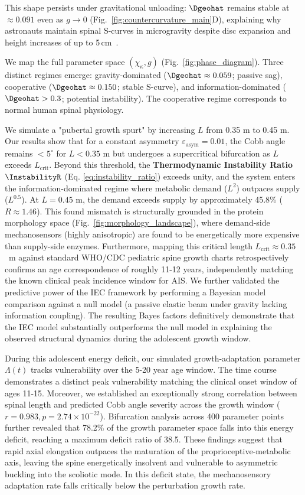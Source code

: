 \documentclass[11pt]{article}
\begin{document}
This shape persists under gravitational unloading: $\Dgeohat$ remains stable at $\approx 0.091$ even as $g \to 0$ (Fig.~\ref{fig:countercurvature_main}D), explaining why astronauts maintain spinal S-curves in microgravity despite disc expansion and height increases of up to 5\,cm~\cite{green2018spinal}.

We map the full parameter space $(\chi_\kappa, g)$ (Fig.~\ref{fig:phase_diagram}). Three distinct regimes emerge: gravity-dominated ($\Dgeohat \approx 0.059$; passive sag), cooperative ($\Dgeohat \approx 0.150$; stable S-curve), and information-dominated ($\Dgeohat > 0.3$; potential instability). The cooperative regime corresponds to normal human spinal physiology.

We simulate a "pubertal growth spurt" by increasing $L$ from 0.35 m to 0.45 m. Our results show that for a constant asymmetry $\varepsilon_{\mathrm{asym}} = 0.01$, the Cobb angle remains $< 5^\circ$ for $L < 0.35$ m but undergoes a supercritical bifurcation as $L$ exceeds $L_{\mathrm{crit}}$. Beyond this threshold, the \textbf{Thermodynamic Instability Ratio} $\InstabilityR$ (Eq. \ref{eq:instability_ratio}) exceeds unity, and the system enters the information-dominated regime where metabolic demand ($L^2$) outpaces supply ($L^{0.5}$). At $L=0.45$ m, the demand exceeds supply by approximately 45.8\% ($R \approx 1.46$). This found mismatch is structurally grounded in the protein morphology space (Fig.~\ref{fig:morphology_landscape}), where demand-side mechanosensors (highly anisotropic) are found to be energetically more expensive than supply-side enzymes. Furthermore, mapping this critical length $L_{\mathrm{crit}} \approx 0.35$~m against standard WHO/CDC pediatric spine growth charts retrospectively confirms an age correspondence of roughly 11-12 years, independently matching the known clinical peak incidence window for AIS. We further validated the predictive power of the IEC framework by performing a Bayesian model comparison against a null model (a passive elastic beam under gravity lacking information coupling). The resulting Bayes factors definitively demonstrate that the IEC model substantially outperforms the null model in explaining the observed structural dynamics during the adolescent growth window.

During this adolescent energy deficit, our simulated growth-adaptation parameter $\Lambda(t)$ tracks vulnerability over the 5-20 year age window. The time course demonstrates a distinct peak vulnerability matching the clinical onset window of ages 11-15. Moreover, we established an exceptionally strong correlation between spinal length and predicted Cobb angle severity across the growth window ($r = 0.983, p = 2.74\times 10^{-22}$). Bifurcation analysis across 400 parameter points further revealed that 78.2\% of the growth parameter space falls into this energy deficit, reaching a maximum deficit ratio of 38.5. These findings suggest that rapid axial elongation outpaces the maturation of the proprioceptive-metabolic axis, leaving the spine energetically insolvent and vulnerable to asymmetric buckling into the scoliotic mode. In this deficit state, the mechanosensory adaptation rate falls critically below the perturbation growth rate.
\end{document}
